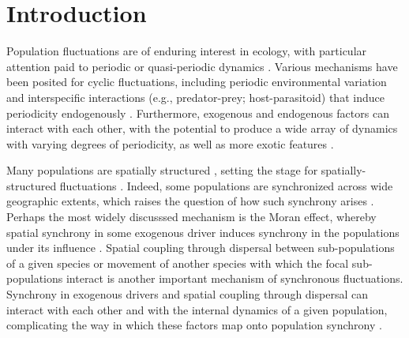 \section*{Introduction} \label{introduction}

Population fluctuations are of enduring interest in ecology,
with particular attention paid to periodic or quasi-periodic dynamics
\citep{elton1924, myers2018}.
Various mechanisms have been posited for cyclic fluctuations,
including periodic environmental variation and 
interspecific interactions (e.g., predator-prey; host-parasitoid)
that induce periodicity endogenously 
\citep{nicholson1935, andrewartha1954, rosenzweig1963}. 
Furthermore, exogenous and endogenous factors can interact with each other,
with the potential to produce a wide array of dynamics with
varying degrees of periodicity, as well as more exotic features
\citep{bjornstad2001, turchin2003, ives2008}.

Many populations are spatially structured \citep{hanski1998},
setting the stage for spatially-structured fluctuations 
\citep{bjornstad1999spatial, gouveia2016}.
Indeed, some populations are synchronized across wide geographic extents,
which raises the question of how such synchrony arises
\citep{ranta1995synchrony, krebs2002}.
Perhaps the most widely discusssed mechanism is the Moran effect,
whereby spatial synchrony in some exogenous driver induces synchrony
in the populations under its influence
\citep{moran1953}. 
Spatial coupling through dispersal between sub-populations of a given species
\citep{liebhold2004, goldwyn2008}
or movement of another species with which the focal sub-populations interact
\citep{gilg2009, ims2000}
is another important mechanism of synchronous fluctuations.
Synchrony in exogenous drivers and spatial coupling through dispersal 
can interact with each other and with the internal dynamics of a given population,
complicating the way in which these factors map onto population synchrony
\citep{ranta1995synchrony, kendall2000dispersal, abbott2011}.

